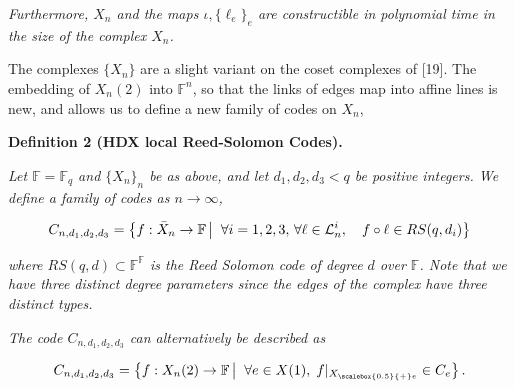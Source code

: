 \emph{Furthermore, $X_{n}$ and the maps $\iota,\{\ell_{e}\}_{e}$ are constructible in polynomial time in the size of the complex $X_{n}$.}\par






The complexes $\{X_{n}\}$ are a slight variant on the coset complexes of [19].
The embedding of $X_{n}(2)$ into $\mathbb{F}^{n}$, so that the links of edges map into affine lines is new, and allows us to define a new family of codes on $X_{n}$,\par





\par\medskip\noindent\textbf{
\textbf{Definition 2}\textbf{ }(HDX local Reed-Solomon Codes)\textbf{.}
}\par



\emph{Let $\mathbb{F}=\mathbb{F}_{q}$ and $\{X_{n}\}_{n}$ be as above, and let $d_{1},d_{2},d_{3}<q$ be positive integers. We define a family of codes as $n\to\infty$,}\par


\[\begin{gathered}
\displaystyle C_{n,d_{1},d_{2},d_{3}} \displaystyle=\left\{f:\bar{X}_{n}\to\mathbb{F}\left|\;\vphantom{f:\bar{X}_{n}\to\mathbb{F}\forall i=1,2,3,\,\forall\ell\in{\cal L}_{n}^{i},\quad f\circ\ell\in RS(q,d_{i})}\right.\forall i=1,2,3,\,\forall\ell\in{\cal L}_{n}^{i},\quad f\circ\ell\in RS(q,d_{i})\right\}
\end{gathered}\]


\emph{where $RS(q,d)\subset\mathbb{F}^{\mathbb{F}}$ is the Reed Solomon code of degree $d$ over $\mathbb{F}$. Note that we have three distinct degree parameters since the edges of the complex have three distinct types.}\par




\emph{The code $C_{n,d_{1},d_{2},d_{3}}$ can alternatively be described as}\par


\[\begin{gathered}
\displaystyle C_{n,d_{1},d_{2},d_{3}} \displaystyle=\left\{f:X_{n}(2)\to\mathbb{F}\left|\;\vphantom{f:X_{n}(2)\to\mathbb{F}\forall e\in X(1),\;f|_{{X}_{\scalebox{0.5}{+}e}}\in C_{e}}\right.\forall e\in X(1),\;f|_{{X}_{\scalebox{0.5}{+}e}}\in C_{e}\right\}.
\end{gathered}\]


